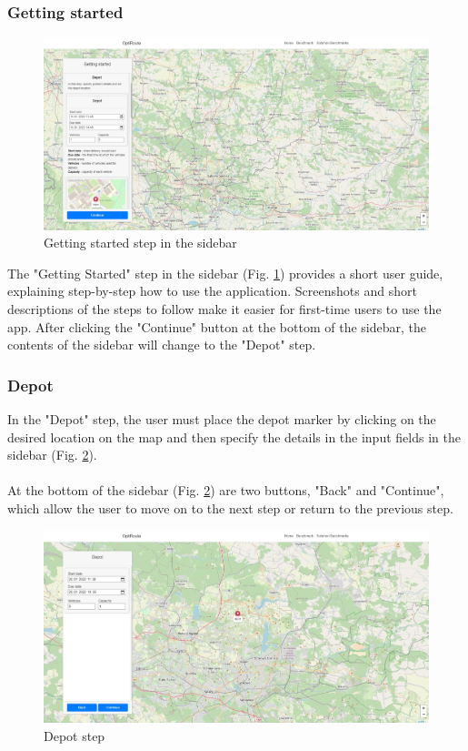 \documentclass[a4paper,twoside,12pt]{book}
\begin{document}
\subsubsection{Getting started}
\begin{figure}[H]
\centering
\includegraphics[scale=0.3]{images/gettingStarted.jpg}
\caption{Getting started step in the sidebar}
\label{fig:gettingStarted}
\end{figure}
The "Getting Started" step in the sidebar (Fig. \ref{fig:gettingStarted}) provides a short user guide, explaining step-by-step how to use the application. Screenshots and short descriptions of the steps to follow make it easier for first-time users to use the app. After clicking the "Continue" button at the bottom of the sidebar, the contents of the sidebar will change to the "Depot" step.

\subsubsection{Depot}
In the "Depot" step, the user must place the depot marker by clicking on the desired location on the map and then specify the details in the input fields in the sidebar (Fig. \ref{fig:depot}).

\paragraph{}

At the bottom of the sidebar (Fig. \ref{fig:depot}) are two buttons, "Back" and "Continue", which allow the user to move on to the next step or return to the previous step.

\begin{figure}[H]
\centering
\includegraphics[scale=0.3]{images/depot.jpg}
\caption{Depot step}
\label{fig:depot}
\end{figure}
\end{document}

